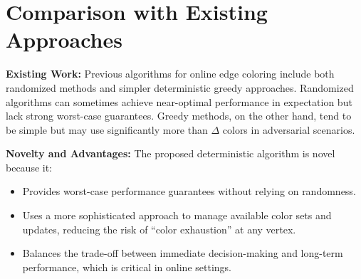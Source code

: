 \documentclass[11pt]{article}
\begin{document}
\begin{center}
\end{center}

\section{Comparison with Existing Approaches}
\textbf{Existing Work:}  
Previous algorithms for online edge coloring include both randomized methods and simpler deterministic greedy approaches. Randomized algorithms can sometimes achieve near-optimal performance in expectation but lack strong worst-case guarantees. Greedy methods, on the other hand, tend to be simple but may use significantly more than \(\Delta\) colors in adversarial scenarios.

\textbf{Novelty and Advantages:}  
The proposed deterministic algorithm is novel because it:
\begin{itemize}[noitemsep]
    \item Provides worst-case performance guarantees without relying on randomness.
    \item Uses a more sophisticated approach to manage available color sets and updates, reducing the risk of “color exhaustion” at any vertex.
    \item Balances the trade-off between immediate decision-making and long-term performance, which is critical in online settings.
\end{itemize}
\end{document}
